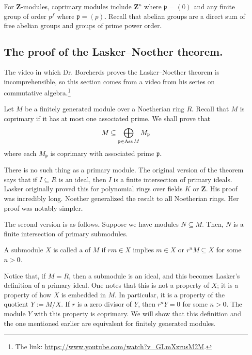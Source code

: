 \documentclass [11 pt, oneside] {article}
\begin{document}
For $\mathbf{Z}$-modules, coprimary modules include $\mathbf{Z}^n$ where $\mathfrak{p}=(0)$ and any finite group of order $p^f$ where $\mathfrak{p} = (p)$. Recall that abelian groups are a direct sum of free abelian groups and groups of prime power order.

\subsection{The proof of the Lasker--Noether theorem.}
The video in which Dr. Borcherds proves the Lasker--Noether theorem is incomprehensible, so this section comes from a video from his series on commutative algebra.\footnote{The link: \url{https://www.youtube.com/watch?v=GLmXzrusM2M}.}

Let $M$ be a finitely generated module over a Noetherian ring $R$. Recall that $M$ is coprimary if it has at most one associated prime. We shall prove that
\begin{align*}
	M \subseteq \bigoplus_{\mathfrak{p}\in \operatorname{Ass} M} M_{\mathfrak{p}}
\end{align*}
where each $M_{\mathfrak{p}}$ is coprimary with associated prime $ \mathfrak{p}$. 

There is no such thing as a primary module. The original version of the theorem says that if $I\subseteq R$ is an ideal, then $I$ is a finite intersection of primary ideals. Lasker originally proved this for polynomial rings over fields $K$ or $\mathbf{Z}$. His proof was incredibly long. Noether generalized the result to all Noetherian rings. Her proof was notably simpler.

The second version is as follows. Suppose we have modules $N\subseteq M$. Then, $N$ is a finite intersection of primary submodules.

\begin{definition}[ ]\label{}
A submodule $X$ is called a  of $M$ if $rm\in X$ implies $m\in X$ or $r^nM\subseteq X$ for some $n>0$.
\end{definition}

Notice that, if $M=R$, then a submodule is an ideal, and this becomes Lasker's definition of a primary ideal. One notes that this is not a property of $X$; it is a property of how $X$ is embedded in $M$. In particular, it is a property of the quotient $Y:= M/X$. If $r$ is a zero divisor of $Y$, then $r^nY=0$ for some $n>0$. The module $Y$ with this property is coprimary. We will show that this definition and the one mentioned earlier are equivalent for finitely generated modules.
\end{document}
